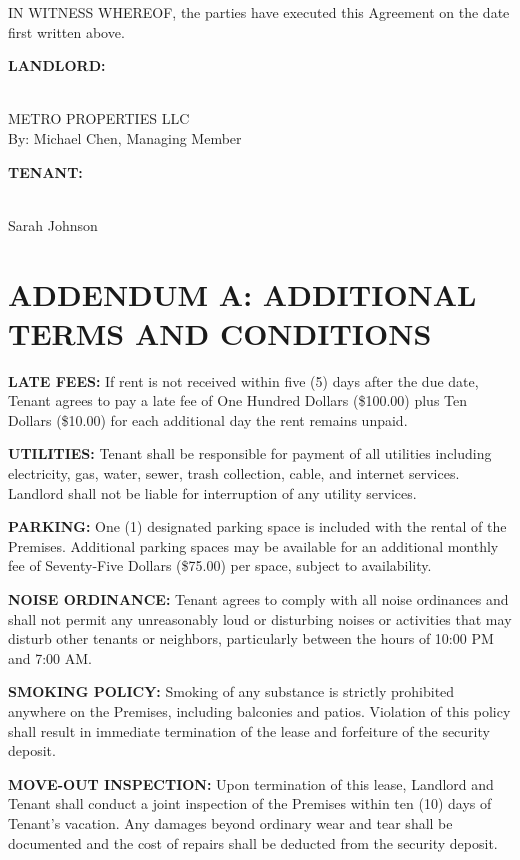 \documentclass[12pt,letterpaper]{article}
\begin{document}
\vspace{0.5cm}
\noindent IN WITNESS WHEREOF, the parties have executed this Agreement on the date first written above.

\vspace{1cm}
\noindent \textbf{LANDLORD:}

\vspace{0.5cm}
\noindent \underline{\hspace{3in}}\\
METRO PROPERTIES LLC\\
By: Michael Chen, Managing Member

\vspace{1cm}
\noindent \textbf{TENANT:}

\vspace{0.5cm}
\noindent \underline{\hspace{3in}}\\
Sarah Johnson

\newpage

\section*{ADDENDUM A: ADDITIONAL TERMS AND CONDITIONS}

\noindent \textbf{LATE FEES:} If rent is not received within five (5) days after the due date, Tenant agrees to pay a late fee of One Hundred Dollars (\$100.00) plus Ten Dollars (\$10.00) for each additional day the rent remains unpaid.

\vspace{0.2cm}
\noindent \textbf{UTILITIES:} Tenant shall be responsible for payment of all utilities including electricity, gas, water, sewer, trash collection, cable, and internet services. Landlord shall not be liable for interruption of any utility services.

\vspace{0.2cm}
\noindent \textbf{PARKING:} One (1) designated parking space is included with the rental of the Premises. Additional parking spaces may be available for an additional monthly fee of Seventy-Five Dollars (\$75.00) per space, subject to availability.

\vspace{0.2cm}
\noindent \textbf{NOISE ORDINANCE:} Tenant agrees to comply with all noise ordinances and shall not permit any unreasonably loud or disturbing noises or activities that may disturb other tenants or neighbors, particularly between the hours of 10:00 PM and 7:00 AM.

\vspace{0.2cm}
\noindent \textbf{SMOKING POLICY:} Smoking of any substance is strictly prohibited anywhere on the Premises, including balconies and patios. Violation of this policy shall result in immediate termination of the lease and forfeiture of the security deposit.

\vspace{0.2cm}
\noindent \textbf{MOVE-OUT INSPECTION:} Upon termination of this lease, Landlord and Tenant shall conduct a joint inspection of the Premises within ten (10) days of Tenant's vacation. Any damages beyond ordinary wear and tear shall be documented and the cost of repairs shall be deducted from the security deposit.
\end{document}

